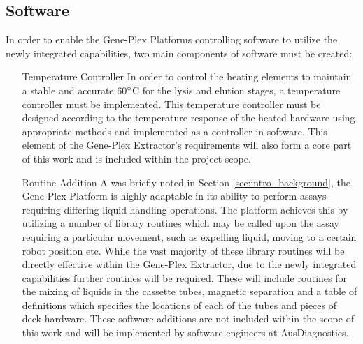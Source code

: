 \subsection{Software}
\label{sec:intro_software}
In order to enable the Gene-Plex Platforms controlling software to utilize the newly integrated capabilities, two main components of software must be created:
\begin{enumerate}
	\item[Temperature Controller] In order to control the heating elements to maintain a stable and accurate 60$\degree$C for the lysis and elution stages, a temperature controller must be implemented. This temperature controller must be designed according to the temperature response of the heated hardware using appropriate methods and implemented as a controller in software. This element of the Gene-Plex Extractor's requirements will also form a core part of this work and is included within the project scope.
	\item [Routine Addition] A was briefly noted in Section \ref{sec:intro_background}, the Gene-Plex Platform is highly adaptable in its ability to perform assays requiring differing liquid handling operations. The platform achieves this by utilizing a number of library routines which may be called upon the assay requiring a particular movement, such as expelling liquid, moving to a certain robot position etc. While the vast majority of these library routines will be directly effective within the Gene-Plex Extractor, due to the newly integrated capabilities further routines will be required. These will include routines for the mixing of liquids in the cassette tubes, magnetic separation and a table of definitions which specifies the locations of each of the tubes and pieces of deck hardware. These software additions are not included within the scope of this work and will be implemented by software engineers at AusDiagnostics.
\end{enumerate}